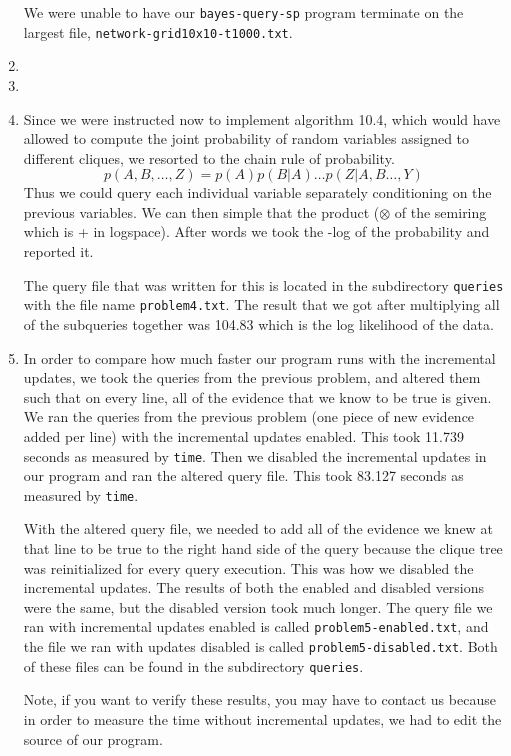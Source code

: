 \documentclass[11pt,a4paper]{article}
\begin{document}
\begin{enumerate}
		We were unable to have our {\tt bayes-query-sp} program terminate on the largest file,
		{\tt network-grid10x10-t1000.txt}.
		
		\item
		\item
		\item Since we were instructed now to implement algorithm 10.4, which would have allowed to compute the joint probability of random variables assigned to different cliques, we resorted to the chain rule of probability. 
		$$
		p(A,B,\ldots,Z) = p(A)p(B|A)\ldots p(Z|A,B\ldots,Y)
		$$
		Thus we could query each individual variable separately conditioning on the previous 
		variables. We can then simple that the product ($\otimes$ of the semiring which is + 
		in logspace). After words we took the -log of the probability and reported it. 
		
		The query file that was written for this is located in the subdirectory {\tt queries}
		with the file name {\tt problem4.txt}. The result that we got after multiplying all of
		the subqueries together was 104.83 which is the log likelihood of the data.
		
		\item In order to compare how much faster our program runs with the incremental
		updates, we took the queries from the previous problem, and altered them such that
		on every line, all of the evidence that we know to be true is given. We ran the queries
		from the previous problem (one piece of new evidence added per line) with the 
		incremental updates enabled. This took 11.739 seconds as measured by {\tt time}.
		Then we disabled the incremental updates in our program and ran the altered
		query file. This took 83.127 seconds as measured by {\tt time}. 
		
		With the altered query file, we needed to add all of the evidence we knew at that
		line to be true to the right hand side of the query because the clique tree was
		reinitialized for every query execution. This was how we disabled the incremental
		updates. The results of both the enabled and disabled versions were the same, but
		the disabled version took much longer. The query file we ran with incremental
		updates enabled is called {\tt problem5-enabled.txt}, and the file we ran with
		updates disabled is called {\tt problem5-disabled.txt}. Both of these files can be
		found in the subdirectory {\tt queries}. 
		
		Note, if you want to verify these results, you may have to contact us because
		in order to measure the time without incremental updates, we had to edit the
		source of our program.
		

\end{enumerate}
\end{document}
